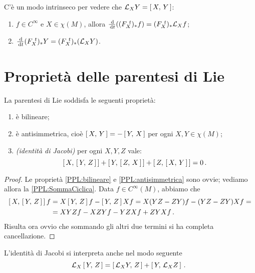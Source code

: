 \begin{remark}
	C'è un modo intrinseco per vedere che $\mathcal L_XY=\left[\,X,\,Y\,\right]$:
	\begin{enumerate}
	 \item $f\in C^\infty$ e $X\in\chi(M)$, allora $\frac {\,\mathrm d}{\,\mathrm d t} ((F_{X}^{\ t})_*f)=(F_{X}^{\ t})_*\mathcal L_Xf$;
	 \item $\frac{\,\mathrm d}{\,\mathrm d t} (F_{X}^{\ t})_*Y=(F_{X}^{\ t})_*(\mathcal L_XY)$.
	\end{enumerate}
\end{remark}

\section{Proprietà delle parentesi di Lie}

\begin{proposition}\label{prop:ProprietaParentesiLie}
	La parentesi di Lie soddisfa le seguenti proprietà:
	\begin{enumerate}
	 \item è bilineare; \label{PPL:bilineare}
	 \item è antisimmetrica, cioè $\left[\,X,\,Y\,\right]=-\left[\,Y,\,X\,\right]$ per ogni $X,Y\in\chi(M)$; \label{PPL:antisimmetrica}
	 \item \emph{(identità di Jacobi)} per ogni $X,Y,Z$ vale: 
	 \begin{equation*}\left[\,X,\,\left[\,Y,\,Z\,\right]\,\right]+\left[\,Y,\,\left[\,Z,\,X\,\right]\,\right]+\left[\,Z,\,\left[\,X,\,Y\,\right]\,\right]=0\, \text{. }\end{equation*} \label{PPL:SommaCiclica}
	\end{enumerate}
\end{proposition}

\begin{proof}
	Le proprietà \ref{PPL:bilineare} e \ref{PPL:antisimmetrica} sono ovvie; vediamo allora la \ref{PPL:SommaCiclica}. Data $f\in C^\infty(M)$, abbiamo che
	\begin{align*}
		\left[\,X,\,\left[\,Y,\,Z\,\right]\,\right]f&=X\left[\,Y,\,Z\,\right]f-\left[\,Y,\,Z\,\right]Xf=X(YZ-ZY)f-(YZ-ZY)Xf=\\
		&= XYZf-XZYf-YZXf+ZYXf\, \text{. }
	\end{align*}
	Risulta ora ovvio che sommando gli altri due termini si ha completa cancellazione.
\end{proof}

\begin{remark}
	L'identità di Jacobi si interpreta anche nel modo seguente
	\begin{equation*}
		\mathcal L_X\left[\,Y,\,Z\,\right]=\left[\,\mathcal L_XY,\,Z\,\right]+\left[\,Y,\,\mathcal L_XZ\,\right]\, \text{. }
	\end{equation*}
\end{remark}


